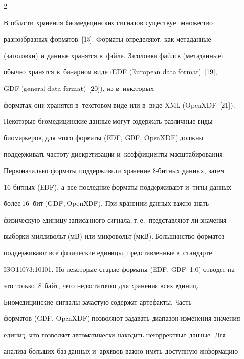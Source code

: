 \begin{multicols}{2}





    В области хранения биомедицинских сигналов существует множество 


разнообразных форматов~[18]. Форматы определяют, как метаданные 


(заголовки) и~данные хранятся в~файле. Заголовки файлов (метаданные) 


обычно хранятся в~бинарном виде (EDF (European data format)~[19], 


GDF (general data format)~[20]), но в~некоторых 


форматах они хранятся в~текстовом виде или в~виде XML (OpenXDF~[21]). 


    


    Некоторые биомедицинские данные могут содержать различные виды 


биомаркеров, для этого форматы (EDF, GDF, OpenXDF) должны 


поддерживать частоту дискретизации и~коэффициенты масштабирования. 


Первоначально форматы поддерживали хранение 8-бит\-ных данных, затем  


16-бит\-ных (EDF), а~все последние форматы поддерживают и~типы данных 


более 16~бит (GDF, OpenXDF). При хранении данных важно знать 


физическую единицу записанного сигнала, т.\,е.\ представляют ли значения 


выборки милливольт (мВ) или микровольт (мкВ). Большинство форматов 


поддерживают все физические единицы, представленные в~стандарте 


ISO11073:10101. Но некоторые старые форматы (EDF, GDF~1.0) отводят на 


это только~8~байт, чего недостаточно для хранения всех единиц.


    


    Биомедицинские сигналы зачастую содержат артефакты. Часть 


форматов (GDF, OpenXDF) позволяют задавать диапазон изменения значения 


единиц, что позволяет автоматически находить некорректные данные. Для 


анализа больших баз данных и~архивов важно иметь доступную информацию 



\end{multicols}
